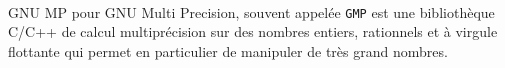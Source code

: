	\paragraph{}{\ttfamily GNU MP} pour {\ttfamily GNU Multi Precision}, souvent appelée \lstinline!GMP! est une bibliothèque {\ttfamily C}/{\ttfamily C++} de calcul multiprécision sur des nombres entiers, rationnels et à virgule flottante qui permet en particulier de manipuler de très grand nombres.
	